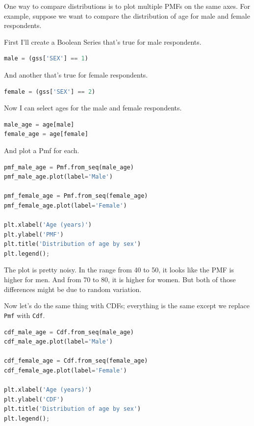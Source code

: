 One way to compare distributions is to plot multiple PMFs on the same
axes. For example, suppose we want to compare the distribution of age
for male and female respondents.

First I'll create a Boolean Series that's true for male respondents.

\begin{lstlisting}[language=Python,style=source]
male = (gss['SEX'] == 1)
\end{lstlisting}

And another that's true for female respondents.

\begin{lstlisting}[language=Python,style=source]
female = (gss['SEX'] == 2)
\end{lstlisting}

Now I can select ages for the male and female respondents.

\begin{lstlisting}[language=Python,style=source]
male_age = age[male]
female_age = age[female]
\end{lstlisting}

And plot a Pmf for each.

\begin{lstlisting}[language=Python,style=source]
pmf_male_age = Pmf.from_seq(male_age)
pmf_male_age.plot(label='Male')

pmf_female_age = Pmf.from_seq(female_age)
pmf_female_age.plot(label='Female')

plt.xlabel('Age (years)') 
plt.ylabel('PMF')
plt.title('Distribution of age by sex')
plt.legend();
\end{lstlisting}

The plot is pretty noisy. In the range from 40 to 50, it looks like the
PMF is higher for men. And from 70 to 80, it is higher for women. But
both of those differences might be due to random variation.

Now let's do the same thing with CDFs; everything is the same except we
replace \passthrough{\lstinline!Pmf!} with
\passthrough{\lstinline!Cdf!}.

\begin{lstlisting}[language=Python,style=source]
cdf_male_age = Cdf.from_seq(male_age)
cdf_male_age.plot(label='Male')

cdf_female_age = Cdf.from_seq(female_age)
cdf_female_age.plot(label='Female')

plt.xlabel('Age (years)') 
plt.ylabel('CDF')
plt.title('Distribution of age by sex')
plt.legend();
\end{lstlisting}

